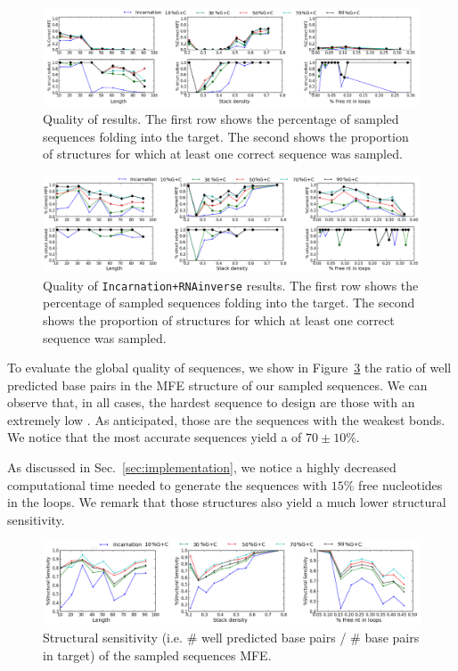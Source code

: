 \begin{figure}[ht!]	
	\centering
	\includegraphics[width=\textwidth]{Figures/mfe_struct_solve_nornainverse.png}
	\caption{Quality of \ourprog results. The first row shows the percentage
	of sampled sequences folding into the target. The second shows the 	
	proportion	of structures for which at least one correct sequence was 
	sampled.}
	\label{fig:mfe_struct_solved_noinverse}	
\end{figure}



\begin{figure}[ht!]	
	\centering
	\includegraphics[width=\textwidth]{Figures/mfe_struct_solved}
	\caption{Quality of \texttt{Incarnation+RNAinverse} results. The first row shows the percentage
	of sampled sequences folding into the target. The second shows the 	
	proportion	of structures for which at least one correct sequence was 
	sampled.}
	\label{fig:mfe_struct_solved}	
\end{figure}
 
To evaluate the global quality of \ourprog sequences, we show
in Figure~\ref{fig:ss_sens} the ratio of well predicted base pairs in the
MFE structure of our sampled sequences. We can observe that, in all cases,
the hardest sequence to design are those with an extremely low \GCContent. As anticipated, those are the sequences with the weakest bonds.
We notice that the most accurate sequences yield a \GCContent
of $70\pm 10\%$. 

As discussed in Sec.~\ref{sec:implementation}, we notice a highly decreased
computational time needed to generate the sequences with $15\%$ free 
nucleotides in the loops. We remark that those structures also yield 
a much lower structural sensitivity.

\begin{figure}[ht!]
 	\centering
	\includegraphics[width=\textwidth]{Figures/rnastrand_clustered_rnainverse_100samples_struct_sens.png}
	\caption{Structural sensitivity (i.e. $\#$ well predicted base pairs / $\#$ base pairs in target) of the sampled sequences MFE. }
	\label{fig:ss_sens}	
\end{figure}


